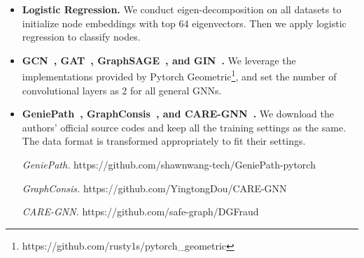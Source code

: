 \begin{itemize}[leftmargin=*]
	
	\item
	\textbf{Logistic Regression.}  We conduct eigen-decomposition on all datasets to initialize node embeddings with top 64 eigenvectors.  Then we apply logistic regression to classify nodes. 
	
	\item
	\textbf{GCN~\cite{kipf2016semi}, GAT~\cite{velivckovic2017graph}, GraphSAGE~\cite{Graphsage}, and GIN~\cite{xu2018powerful}.} We leverage the implementations provided by Pytorch Geometric\footnote{https://github.com/rusty1s/pytorch\_geometric}, and set the number of convolutional layers as 2 for all general GNNs. 
 	
	\item
	\textbf{GeniePath~\cite{liu2019geniepath}, GraphConsis~\cite{liu2020alleviating}, and CARE-GNN~\cite{dou2020enhancing}.} We download the authors' official source codes and keep all the training settings as the same. The data format is transformed appropriately to fit their settings.
	
	
	\textit{GeniePath.} https://github.com/shawnwang-tech/GeniePath-pytorch
	
	\textit{GraphConsis.} https://github.com/YingtongDou/CARE-GNN
	
	\textit{CARE-GNN.} https://github.com/safe-graph/DGFraud
	
	
\end{itemize}


